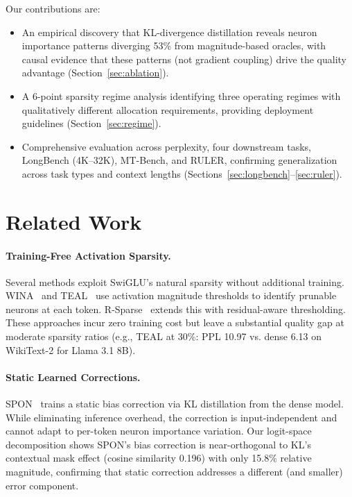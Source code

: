 \documentclass[11pt,a4paper]{article}
\begin{document}
Our contributions are:
\begin{itemize}[nosep,leftmargin=*]
\item An empirical discovery that KL-divergence distillation reveals neuron importance patterns diverging 53\% from magnitude-based oracles, with causal evidence that these patterns (not gradient coupling) drive the quality advantage (Section~\ref{sec:ablation}).
\item A 6-point sparsity regime analysis identifying three operating regimes with qualitatively different allocation requirements, providing deployment guidelines (Section~\ref{sec:regime}).
\item Comprehensive evaluation across perplexity, four downstream tasks, LongBench (4K--32K), MT-Bench, and RULER, confirming generalization across task types and context lengths (Sections~\ref{sec:longbench}--\ref{sec:ruler}).
\end{itemize}

\section{Related Work}

\paragraph{Training-Free Activation Sparsity.}
Several methods exploit SwiGLU's natural sparsity without additional training.
WINA~\cite{alizadeh2024llmflash} and TEAL~\cite{song2024teal} use activation magnitude thresholds to identify prunable neurons at each token.
R-Sparse~\cite{zhang2024rsparse} extends this with residual-aware thresholding.
These approaches incur zero training cost but leave a substantial quality gap at moderate sparsity ratios (e.g., TEAL at 30\%: PPL 10.97 vs. dense 6.13 on WikiText-2 for Llama 3.1 8B).

\paragraph{Static Learned Corrections.}
SPON~\cite{huang2024spon} trains a static bias correction via KL distillation from the dense model.
While eliminating inference overhead, the correction is input-independent and cannot adapt to per-token neuron importance variation.
Our logit-space decomposition shows SPON's bias correction is near-orthogonal to KL's contextual mask effect (cosine similarity 0.196) with only 15.8\% relative magnitude, confirming that static correction addresses a different (and smaller) error component.
\end{document}
